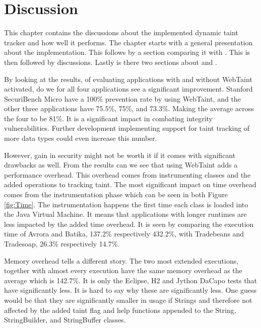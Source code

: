 \chapter{Discussion}

This chapter contains the discussions about the implemented dynamic taint tracker and how well it performs. The chapter starts with a general presentation about the implementation. This follows by a section comparing it with \textit{}. This is then followed by \textit{} discussions. Lastly is there two sections about \textit{} and \textit{}.

By looking at the results, of evaluating applications with and without WebTaint activated, do we for all four applications see a significant improvement. Stanford SecuriBench Micro have a 100\% prevention rate by using WebTaint, and the other three applications have 75.5\%, 75\%, and 73.3\%. Making the average across the four to be 81\%. It is a significant impact in combating integrity vulnerabilities. Further development implementing support for taint tracking of more data types could even increase this number.

However, gain in security might not be worth it if it comes with significant drawbacks as well. From the results can we see that using WebTaint adds a performance overhead. This overhead comes from instrumenting classes and the added operations to tracking taint. The most significant impact on time overhead comes from the instrumentation phase which can be seen in both Figure \ref{fig:Time}. The instrumentation happens the first time each class is loaded into the Java Virtual Machine. It means that applications with longer runtimes are less impacted by the added time overhead. It is seen by comparing the execution time of Avrora and Batika, 137.2\% respectively 432.2\%, with Tradebeans and Tradesoap, 26.3\% respectively 14.7\%.

Memory overhead tells a different story. The two most extended executions, together with almost every execution have the same memory overhead as the average which is 142.7\%. It is only the Eclipse, H2 and Jython DaCapo tests that have significantly less. It is hard to say why these are significantly less. One guess would be that they are significantly smaller in usage if Strings and therefore not affected by the added taint flag and help functions appended to the String, StringBuilder, and StringBuffer classes.

